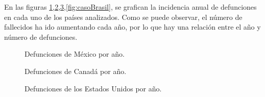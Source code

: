 \documentclass[12pt]{article}
\begin{document}
En las figuras \ref{fig:casoMexico},\ref{fig:casoCanada},\ref{fig:casoUsa},\ref{fig:casoBrasil}, se grafican la incidencia anual de defunciones en cada uno de los países analizados. 
Como se puede observar, el número de fallecidos ha ido aumentando cada año, por lo que hay una relación entre el año y número de defunciones. 


\begin{figure}[H]
%
\hfill
\caption{Defunciones de México por año.}
\label{fig:casoMexico}
\end{figure}

\begin{figure}[H]
%
\hfill
\caption{Defunciones de Canadá por año.}
\label{fig:casoCanada}
\end{figure}

\begin{figure}[H]
%
\hfill
\caption{Defunciones de los Estados Unidos por año.}
\label{fig:casoUsa}
\end{figure}
\end{document}
